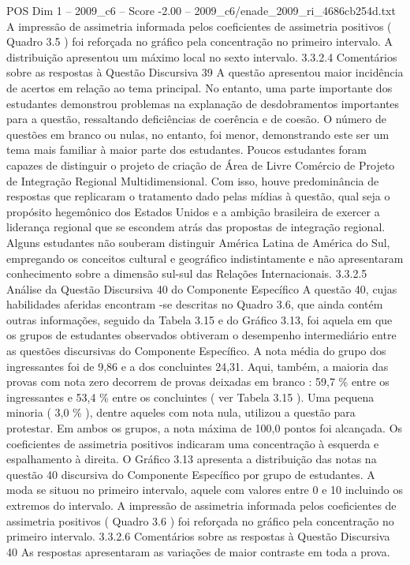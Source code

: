 \begin{textsample}{POS Dim 1 – 2009\_c6 – Score -2.00 – 2009\_c6/enade\_2009\_ri\_4686cb254d.txt}
A impressão de assimetria informada pelos coeficientes de assimetria positivos ( Quadro 3.5 ) foi reforçada no gráfico pela concentração no primeiro intervalo.
A distribuição apresentou um máximo local no sexto intervalo. 3.3.2.4 Comentários sobre as respostas à Questão Discursiva 39 A questão apresentou maior incidência de acertos em relação ao tema principal.
No entanto, uma parte importante dos estudantes demonstrou problemas na explanação de desdobramentos importantes para a questão, ressaltando deficiências de coerência e de coesão.
O número de questões em branco ou nulas, no entanto, foi menor, demonstrando este ser um tema mais familiar à maior parte dos estudantes.
Poucos estudantes foram capazes de distinguir o projeto de criação de Área de Livre Comércio de Projeto de Integração Regional Multidimensional.
Com isso, houve predominância de respostas que replicaram o tratamento dado pelas mídias à questão, qual seja o propósito hegemônico dos Estados Unidos e a ambição brasileira de exercer a liderança regional que se escondem atrás das propostas de integração regional.
Alguns estudantes não souberam distinguir América Latina de América do Sul, empregando os conceitos cultural e geográfico indistintamente e não apresentaram conhecimento sobre a dimensão sul-sul das Relações Internacionais. 3.3.2.5 Análise da Questão Discursiva 40 do Componente Específico A questão 40, cujas habilidades aferidas encontram -se descritas no Quadro 3.6, que ainda contém outras informações, seguido da Tabela 3.15 e do Gráfico 3.13, foi aquela em que os grupos de estudantes observados obtiveram o desempenho intermediário entre as questões discursivas do Componente Específico.
A nota média do grupo dos ingressantes foi de 9,86 e a dos concluintes 24,31.
Aqui, também, a maioria das provas com nota zero decorrem de provas deixadas em branco : 59,7 \% entre os ingressantes e 53,4 \% entre os concluintes ( ver Tabela 3.15 ).
Uma pequena minoria ( 3,0 \% ), dentre aqueles com nota nula, utilizou a questão para protestar.
Em ambos os grupos, a nota máxima de 100,0 pontos foi alcançada.
Os coeficientes de assimetria positivos indicaram uma concentração à esquerda e espalhamento à direita.
O Gráfico 3.13 apresenta a distribuição das notas na questão 40 discursiva do Componente Específico por grupo de estudantes.
A moda se situou no primeiro intervalo, aquele com valores entre 0 e 10 incluindo os extremos do intervalo.
A impressão de assimetria informada pelos coeficientes de assimetria positivos ( Quadro 3.6 ) foi reforçada no gráfico pela concentração no primeiro intervalo. 3.3.2.6 Comentários sobre as respostas à Questão Discursiva 40 As respostas apresentaram as variações de maior contraste em toda a prova.

\end{textsample}

